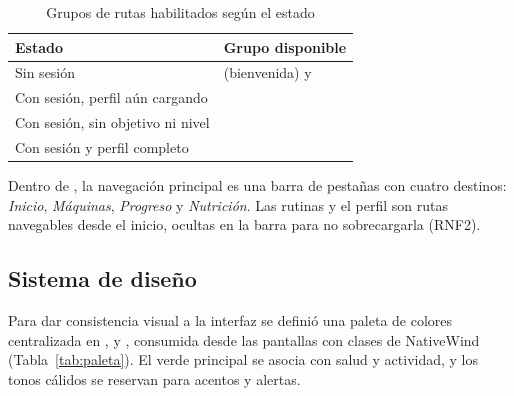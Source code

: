 \begin{table}[H]
\centering
\caption{Grupos de rutas habilitados según el estado}
\label{tab:rutas-protegidas}
\begin{tabularx}{\textwidth}{|Y|L{4.3cm}|}
\hline
{} \textbf{Estado} & \textbf{Grupo disponible} \\
\hline
Sin sesión &  (bienvenida) y  \\ \hline
Con sesión, perfil aún cargando &  \\ \hline
Con sesión, sin objetivo ni nivel &  \\ \hline
Con sesión y perfil completo &  \\
\hline
\end{tabularx}
\end{table}

Dentro de , la navegación principal es una barra de pestañas
con cuatro destinos: \emph{Inicio}, \emph{Máquinas}, \emph{Progreso} y
\emph{Nutrición}. Las rutinas y el perfil son rutas navegables desde el
inicio, ocultas en la barra para no sobrecargarla (RNF2).

\subsection{Sistema de diseño}

Para dar consistencia visual a la interfaz se definió una paleta de colores
centralizada en ,  y
, consumida desde las pantallas con clases de
NativeWind (Tabla~\ref{tab:paleta}). El verde principal se asocia con salud y
actividad, y los tonos cálidos se reservan para acentos y alertas.

